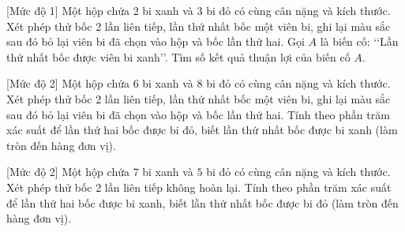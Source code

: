 \begin{bt}%
[Mức độ 1]%
	Một hộp chứa $2$ bi xanh và $3$ bi đỏ có cùng cân nặng và kích thước. Xét phép thử bốc 2 lần liên tiếp, lần thứ nhất bốc một viên bi, ghi lại màu sắc sau đó bỏ lại viên bi đã chọn vào hộp và bốc lần thứ hai. Gọi $A$ là biến cố: \lq\lq Lần thứ nhất bốc được viên bi xanh\rq\rq. Tìm số kết quả thuận lợi của biến cố $A$.
\end{bt}

\begin{bt}%
[Mức độ 2]%
	Một hộp chứa $6$ bi xanh và $8$ bi đỏ có cùng cân nặng và kích thước. Xét phép thử bốc 2 lần liên tiếp, lần thứ nhất bốc một viên bi, ghi lại màu sắc sau đó bỏ lại viên bi đã chọn vào hộp và bốc lần thứ hai. Tính theo phần trăm xác suất để lần thứ hai bốc được bi đỏ, biết lần thứ nhất bốc được bi xanh (làm tròn đến hàng đơn vị).
\end{bt}

\begin{bt}%
[Mức độ 2]%
	Một hộp chứa $7$ bi xanh và $5$ bi đỏ có cùng cân nặng và kích thước. Xét phép thử bốc 2 lần liên tiếp không hoàn lại. Tính theo phần trăm xác suất để lần thứ hai bốc được bi xanh, biết lần thứ nhất bốc được bi đỏ (làm tròn đến hàng đơn vị).
\end{bt}

